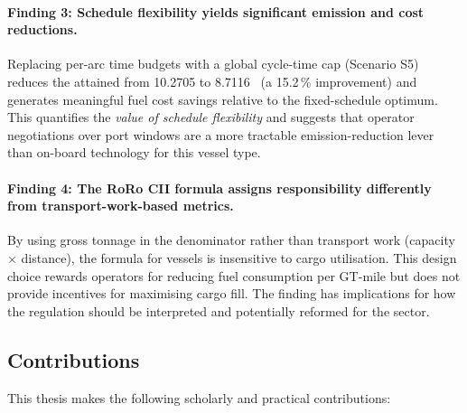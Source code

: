 \paragraph{Finding 3: Schedule flexibility yields significant emission
and cost reductions.}
Replacing per-arc time budgets with a global cycle-time cap (Scenario S5)
reduces the attained \CII{} from 10.2705 to 8.7116~\gGTnm{} (a 15.2\,\%
improvement) and generates meaningful fuel cost savings relative to the
fixed-schedule optimum.  This quantifies the \emph{value of schedule
flexibility} and suggests that operator negotiations over port windows are
a more tractable emission-reduction lever than on-board technology for
this vessel type.

\paragraph{Finding 4: The RoRo CII formula assigns responsibility
differently from transport-work-based metrics.}
By using gross tonnage in the denominator rather than transport work
(capacity $\times$ distance), the \CII{} formula for \RoRo{} vessels
is insensitive to cargo utilisation.  This design choice rewards
operators for reducing fuel consumption per GT-mile but does not provide
incentives for maximising cargo fill.  The finding has implications
for how the regulation should be interpreted and potentially reformed
for the \RoRo{} sector.

\subsection{Contributions}
\label{sec:conc:contributions}

This thesis makes the following scholarly and practical contributions:

